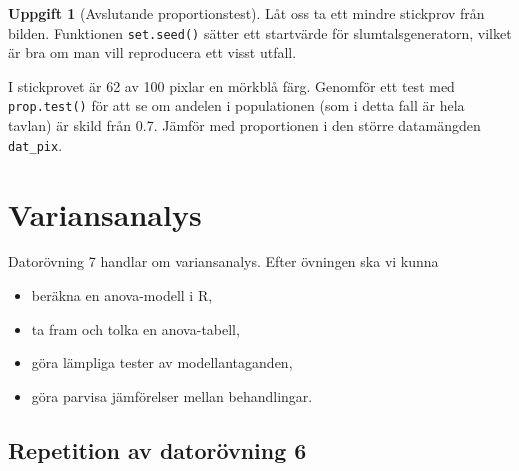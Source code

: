 \documentclass[
]{book}
\newenvironment{Shaded}{\begin{snugshade}}{\end{snugshade}}
\newcommand{\AttributeTok}[1]{\textcolor[rgb]{0.77,0.63,0.00}{#1}}
\newcommand{\DecValTok}[1]{\textcolor[rgb]{0.00,0.00,0.81}{#1}}
\newcommand{\FunctionTok}[1]{\textcolor[rgb]{0.00,0.00,0.00}{#1}}
\newcommand{\NormalTok}[1]{#1}
\newcommand{\OtherTok}[1]{\textcolor[rgb]{0.56,0.35,0.01}{#1}}
\newcommand{\SpecialCharTok}[1]{\textcolor[rgb]{0.00,0.00,0.00}{#1}}
\theoremstyle{definition}
\theoremstyle{definition}
\theoremstyle{definition}
\newtheorem{exercise}{Uppgift}[chapter]
\theoremstyle{definition}
\theoremstyle{remark}
\begin{document}
\begin{exercise}[Avslutande proportionstest]
Låt oss ta ett mindre stickprov från bilden. Funktionen \texttt{set.seed()} sätter ett startvärde för slumtalsgeneratorn, vilket är bra om man vill reproducera ett visst utfall.

\begin{Shaded}
\end{Shaded}

I stickprovet är 62 av 100 pixlar en mörkblå färg. Genomför ett test med \texttt{prop.test()} för att se om andelen i populationen (som i detta fall är hela tavlan) är skild från 0.7. Jämför med proportionen i den större datamängden \texttt{dat\_pix}.
\end{exercise}

\hypertarget{variansanalys}{%
\chapter{Variansanalys}\label{variansanalys}}

Datorövning 7 handlar om variansanalys. Efter övningen ska vi kunna

\begin{itemize}
\item
  beräkna en anova-modell i R,
\item
  ta fram och tolka en anova-tabell,
\item
  göra lämpliga tester av modellantaganden,
\item
  göra parvisa jämförelser mellan behandlingar.
\end{itemize}

\hypertarget{repetition-av-datoruxf6vning-6}{%
\section{Repetition av datorövning 6}\label{repetition-av-datoruxf6vning-6}}
\end{document}
